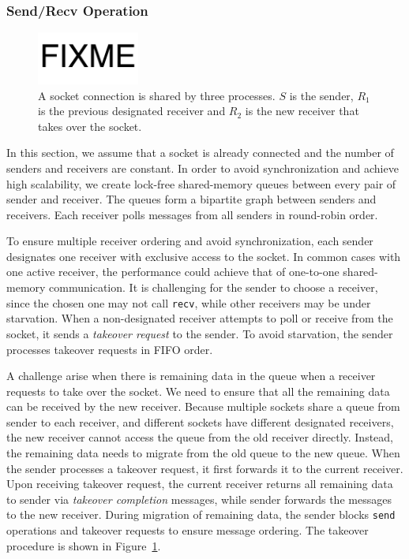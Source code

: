 \subsubsection{Send/Recv Operation}
\label{subsubsec:fork_rdwr}

\begin{figure}[t]
	\centering
	\includegraphics[width=0.3\textwidth]{images/fixme}
	\caption{A socket connection is shared by three processes. $S$ is the sender, $R_1$ is the previous designated receiver and $R_2$ is the new receiver that takes over the socket.}
	\label{fig:fork-takeover}
\end{figure}

In this section, we assume that a socket is already connected and the number of senders and receivers are constant. In order to avoid synchronization and achieve high scalability, we create lock-free shared-memory queues between every pair of sender and receiver. The queues form a bipartite graph between senders and receivers. Each receiver polls messages from all senders in round-robin order.

To ensure multiple receiver ordering and avoid synchronization, each sender designates one receiver with exclusive access to the socket. In common cases with one active receiver, the performance could achieve that of one-to-one shared-memory communication. It is challenging for the sender to choose a receiver, since the chosen one may not call \texttt{recv}, while other receivers may be under starvation. When a non-designated receiver attempts to poll or receive from the socket, it sends a \textit{takeover request} to the sender. To avoid starvation, the sender processes takeover requests in FIFO order.

A challenge arise when there is remaining data in the queue when a receiver requests to take over the socket. We need to ensure that all the remaining data can be received by the new receiver. Because multiple sockets share a queue from sender to each receiver, and different sockets have different designated receivers, the new receiver cannot access the queue from the old receiver directly. Instead, the remaining data needs to migrate from the old queue to the new queue. When the sender processes a takeover request, it first forwards it to the current receiver. Upon receiving takeover request, the current receiver returns all remaining data to sender via \textit{takeover completion} messages, while sender forwards the messages to the new receiver. During migration of remaining data, the sender blocks \texttt{send} operations and takeover requests to ensure message ordering. The takeover procedure is shown in Figure~\ref{fig:fork-takeover}.

